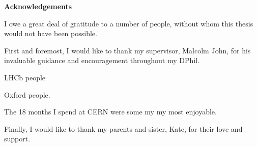 %
%
%


\begin{alwayssingle} 
    \thispagestyle{empty}
    \begin{center}
        \vspace*{1.5cm}
        {\Large \bfseries Acknowledgements}
    \end{center}
    \vspace{0.5cm}
    I owe a great deal of gratitude to a number of people, without whom this thesis would not have been possible.

    First and foremost, I would like to thank my supervisor, Malcolm John, for his invaluable guidance and encouragement throughout my DPhil.  

    LHCb people

    
    Oxford people. 

    The 18 months I spend at CERN were some my my most enjoyable.

    Finally, I would like to thank my parents and sister, Kate, for their love and support.   


\end{alwayssingle}
